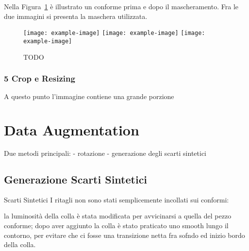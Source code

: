 Nella Figura~\ref{fig:mask} è illustrato un conforme prima e dopo il mascheramento.
Fra le due immagini si presenta la maschera utilizzata.
\begin{figure}[ht] %
  \begin{center}
    \texttt{[image: example-image]}
    \texttt{[image: example-image]}
    \texttt{[image: example-image]}
    \label{fig:mask}
    \caption{TODO}
  \end{center}
\end{figure}

\subsubsection{5 Crop e Resizing}
A questo punto l'immagine contiene una grande porzione 




\clearpage
\section {Data Augmentation}
Due metodi principali:
 - rotazione
 - generazione degli scarti sintetici

\subsection {Generazione Scarti Sintetici}


Scarti Sintetici
 I ritagli non sono stati semplicemente incollati sui conformi:

 la luminosità della colla è stata modificata per avvicinarsi a quella del pezzo conforme;
 dopo aver aggiunto la colla è stato praticato uno smooth lungo il contorno, per evitare che ci fosse una transizione netta fra sofndo ed inizio bordo della colla.







































